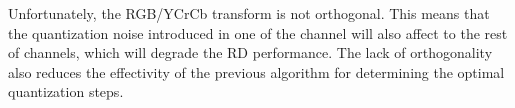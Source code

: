 Unfortunately, the RGB/YCrCb transform is not orthogonal. This
means that the quantization noise introduced in one of the channel
will also affect to the rest of channels, which will degrade the RD
performance. The lack of orthogonality also reduces the effectivity of
the previous algorithm for determining the optimal quantization steps.

\begin{comment}

After analyzing the frame (representing it in the YCrCb domain), the
next natural step is quantization. Supposing that we will use a static
uniform dead-zone quantizer with quantization steps
$\Delta_{\text{Y}}$, $\Delta_{\text{Cr}}$, and $\Delta_{\text{Cb}}$,
for the coefficients Y, Cr, and Cb, repectively, and supposing that
the contribution to the reconstruction of $X$ of one of the
coefficients is not influenced by the contribution of the rest of
coefficients (for this, both color spaces (RGB and YCrCb) should be
\href{https://en.wikipedia.org/wiki/Orthogonality}{orthogonal}), the
optimal quantization steps $\Delta^*_{\text{Y}}$,
$\Delta^*_{\text{Cr}}$, and $\Delta^*_{\text{Cb}}$, can be found using
a constant slope
(\href{https://en.wikipedia.org/wiki/Rate-distortion_theory}{RD}-$\lambda$)
quantization
strategy~\cite{vetterli1995wavelets,sayood2017introduction}.

As it can be seen in this
\href{https://github.com/Sistemas-Multimedia/Sistemas-Multimedia.github.io/blob/master/study_guide/06-color_transform/performance.ipynb}{notebook},
a RD (Rate-Distortion) curve is a 2D graph where we represent the
distortion generated by the quantization as a function of the bit-rate
of the quantization indexes. Thus, the closer the curve to the point
(0,0) of the graph, the better the performance of the encoding system
in RD terms. Now, if we suppose that each component (Y, Cr, and Cb) is
quantized and compressed independently, we can find the optimal
quantization steps, given a maximum target bit-rate $R^{\text{max}}$,
selecting them as
\begin{equation}
  \lambda_{\text{Y}} = \lambda_{\text{Cr}} = \lambda_{\text{Cb}},
\end{equation}
where $\lambda(R)$ is the slope of the RD curve for a given bit-rate
$R$, satisfiying also that
\begin{equation}
  R_{\text{Y}} + R_{\text{Cr}} + R_{\text{Cb}} \le R^{\text{max}}.
\end{equation}


\end{comment}
